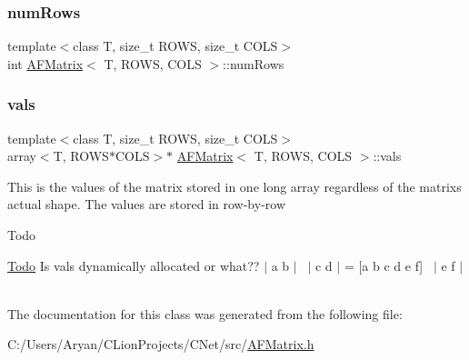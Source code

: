 \mbox{\label{class_a_f_matrix_a8e18ed7d084bfa8b040f7abd89918b42}} 
\subsubsection{\texorpdfstring{num\+Rows}{numRows}}
{\footnotesize\ttfamily template$<$class T, size\+\_\+t R\+O\+WS, size\+\_\+t C\+O\+LS$>$ \\
int \hyperlink{class_a_f_matrix}{A\+F\+Matrix}$<$ T, R\+O\+WS, C\+O\+LS $>$\+::num\+Rows}

\mbox{\label{class_a_f_matrix_abca47cc50d551c1e8d79559773729e87}} 
\subsubsection{\texorpdfstring{vals}{vals}}
{\footnotesize\ttfamily template$<$class T, size\+\_\+t R\+O\+WS, size\+\_\+t C\+O\+LS$>$ \\
array$<$T, R\+O\+WS$\ast$C\+O\+LS$>$$\ast$ \hyperlink{class_a_f_matrix}{A\+F\+Matrix}$<$ T, R\+O\+WS, C\+O\+LS $>$\+::vals}

This is the values of the matrix stored in one long array regardless of the matrix\textquotesingle{}s actual shape. The values are stored in row-\/by-\/row

\begin{DoxyRefDesc}{Todo}
\item[\hyperlink{todo__todo000001}{Todo}]Is vals dynamically allocated or what?? $\vert$ a b $\vert$~\newline
$\vert$ c d $\vert$ = \mbox{[}a b c d e f\mbox{]}~\newline
$\vert$ e f $\vert$~\newline
\end{DoxyRefDesc}


The documentation for this class was generated from the following file\+:\begin{DoxyCompactItemize}
\item 
C\+:/\+Users/\+Aryan/\+C\+Lion\+Projects/\+C\+Net/src/\hyperlink{_a_f_matrix_8h}{A\+F\+Matrix.\+h}\end{DoxyCompactItemize}
